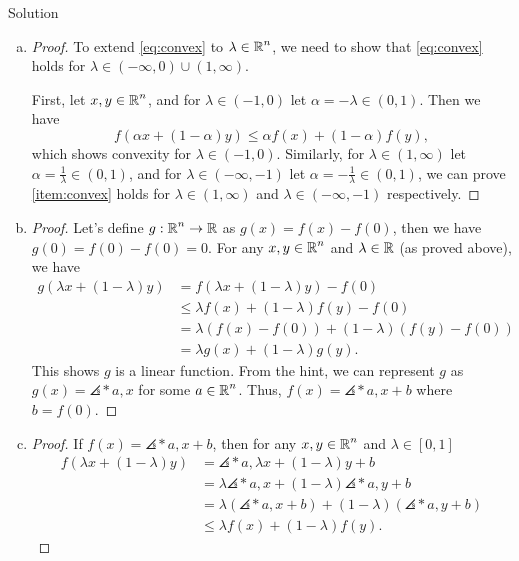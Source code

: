 \documentclass{article}
\begin{document}
\begin{solution}
    {Solution}
    \begin{enumerate}[(a)]
        \item {
            \begin{proof}
                To extend \cref{eq:convex} to $\lambda\in\operatorname{\mathbb{R}}^n$, we need to show that \cref{eq:convex} holds for $\lambda\in(-\infty,0)\cup(1,\infty)$.

                First, let $x,y\in\operatorname{\mathbb{R}}^n$, and for $\lambda\in(-1,0)$ let $\alpha=-\lambda\in(0,1)$. Then we have
                \[
                    f(\alpha x+(1-\alpha)y) \leq \alpha f(x)+(1-\alpha)f(y),
                \]
                which shows convexity for $\lambda\in(-1,0)$.
                Similarly, for $\lambda\in(1,\infty)$ let $\alpha=\frac{1}{\lambda}\in(0,1)$, and for $\lambda\in(-\infty,-1)$ let $\alpha=-\frac{1}{\lambda}\in(0,1)$, we can prove \cref{item:convex} holds for $\lambda\in(1,\infty)$ and $\lambda\in(-\infty,-1)$ respectively.
            \end{proof}
        }
        \item {
            \begin{proof}
                Let's define $g:\operatorname{\mathbb{R}}^n\rightarrow\operatorname{\mathbb{R}}$ as $g(x)=f(x)-f(0)$, then we have $g(0)=f(0)-f(0)=0$. For any $x,y\in\operatorname{\mathbb{R}}^n$ and $\lambda\in\operatorname{\mathbb{R}}$ (as proved above), we have
                \begin{align*}
                    g(\lambda x+(1-\lambda)y) &= f(\lambda x+(1-\lambda)y)-f(0)\\
                    &\leq \lambda f(x)+(1-\lambda)f(y)-f(0)\\
                    &= \lambda(f(x)-f(0))+(1-\lambda)(f(y)-f(0))\\
                    &= \lambda g(x)+(1-\lambda)g(y).
                \end{align*}
                This shows $g$ is a linear function. From the hint, we can represent $g$ as $g(x)=\angles*{a,x}$ for some $a\in\operatorname{\mathbb{R}}^n$. Thus, $f(x)=\angles*{a,x}+b$ where $b=f(0)$.
            \end{proof}
        }
        \item {
            \begin{proof}
                If $f(x)=\angles*{a,x}+b$, then for any $x,y\in\operatorname{\mathbb{R}}^n$ and $\lambda\in[0,1]$
                \begin{align*}
                    f(\lambda x+(1-\lambda)y) &= \angles*{a,\lambda x+(1-\lambda)y}+b\\
                    &= \lambda\angles*{a,x}+(1-\lambda)\angles*{a,y}+b\\
                    &= \lambda(\angles*{a,x}+b)+(1-\lambda)(\angles*{a,y}+b)\\
                    &\leq \lambda f(x)+(1-\lambda)f(y).
                \end{align*}
            \end{proof}
        }
    \end{enumerate}
\end{solution}
\end{document}
